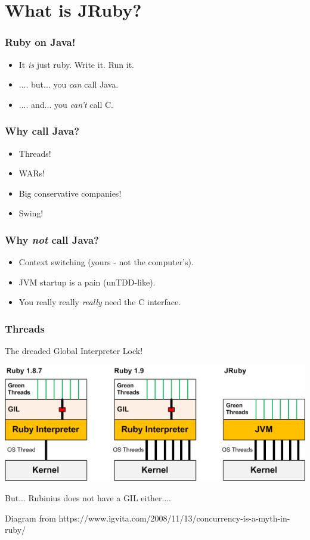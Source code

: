 




\begin{frame}
  \titlepage
\end{frame}

\section{What is JRuby?}
\begin{frame}\frametitle{Ruby on Java!}
\begin{itemize}
  \item It \emph{is} just ruby. Write it. Run it.
  \item .... but... you \emph{can} call Java.
  \item .... and... you \emph{can't} call C.
\end{itemize}
\end{frame}
\begin{frame}\frametitle{Why call Java?}
  \begin{itemize}
    \item Threads!
    \item WARs!
    \item Big conservative companies!
    \item Swing!
  \end{itemize}
\end{frame}
\begin{frame}\frametitle{Why \emph{not} call Java?}
  \begin{itemize}
    \item Context switching (yours - not the computer's).
    \item JVM startup is a pain (unTDD-like).
    \item You really really \emph{really} need the C interface.
  \end{itemize}
\end{frame}
\begin{frame}\frametitle{Threads}
  The dreaded Global Interpreter Lock!
  \begin{centering}
  \includegraphics[scale=.5]{diagrams/ruby-gil.png}
  \end{centering}
  But... Rubinius does not have a GIL either....


{\tiny Diagram from https://www.igvita.com/2008/11/13/concurrency-is-a-myth-in-ruby/}
\end{frame}
